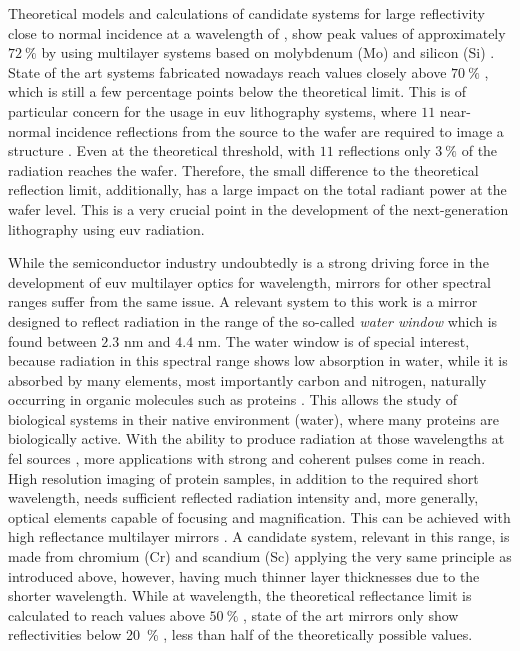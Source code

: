 Theoretical models and calculations of candidate systems for large reflectivity close to normal incidence at a wavelength of , show peak values of approximately $\SI{72}{\percent}$ by using multilayer systems based on molybdenum (Mo) and silicon (Si) \cite{barbee_jr._multi-spectral_1991,finkenthal_near_1990, barbee_molybdenum-silicon_1985}. State of the art systems fabricated nowadays reach values closely above $\SI{70}{\percent}$ \cite{martinez-galarce_high_2000,bajt_improved_2002,braun_grenzflachen-optimierte_2003, braun_mo/si_2002, feigl_euv_2006}, which is still a few percentage points below the theoretical limit. This is of particular concern for the usage in \gls{euv} lithography systems, where $11$ near-normal incidence reflections from the source to the wafer are required to image a structure \cite{kaiser_euvl_2008, wagner_euv_2010}. Even at the theoretical threshold, with $11$ reflections only $\SI{3}{\percent}$ of the radiation reaches the wafer. Therefore, the small difference to the theoretical reflection limit, additionally, has a large impact on the total radiant power at the wafer level. This is a very crucial point in the development of the next-generation lithography using \gls{euv} radiation. 

While the semiconductor industry undoubtedly is a strong driving force in the development of \gls{euv} multilayer optics for  wavelength, mirrors for other spectral ranges suffer from the same issue. A relevant system to this work is a mirror designed to reflect radiation in the range of the so-called \emph{water window} which is found between $2.3$ nm and $4.4$ nm. The water window is of special interest, because radiation in this spectral range shows low absorption in water, while it is absorbed by many elements, most importantly carbon and nitrogen, naturally occurring in organic molecules such as proteins \cite{kirz_soft_1995}. This allows the study of biological systems in their native environment (water), where many proteins are biologically active. With the ability to produce radiation at those wavelengths at \gls{fel} sources \cite{ackermann_operation_2007, schreiber_first_2011}, more applications with strong and coherent pulses come in reach. High resolution imaging of protein samples, in addition to the required short wavelength, needs sufficient reflected radiation intensity and, more generally, optical elements capable of focusing and magnification. This can be achieved with high reflectance multilayer mirrors \cite{hertz_normal-incidence_1999,legall_compact_2012}. A candidate system, relevant in this range, is made from chromium (Cr) and scandium (Sc) applying the very same principle as introduced above, however, having much thinner layer thicknesses due to the shorter wavelength. While at  wavelength, the theoretical reflectance limit is calculated to reach values above $\SI{50}{\percent}$ \cite{schafers_cr/sc_1998}, state of the art mirrors only show reflectivities below \SI{20}{\percent} \cite{eriksson_14.5_2003, yulin_high-performance_2004}, less than half of the theoretically possible values.

